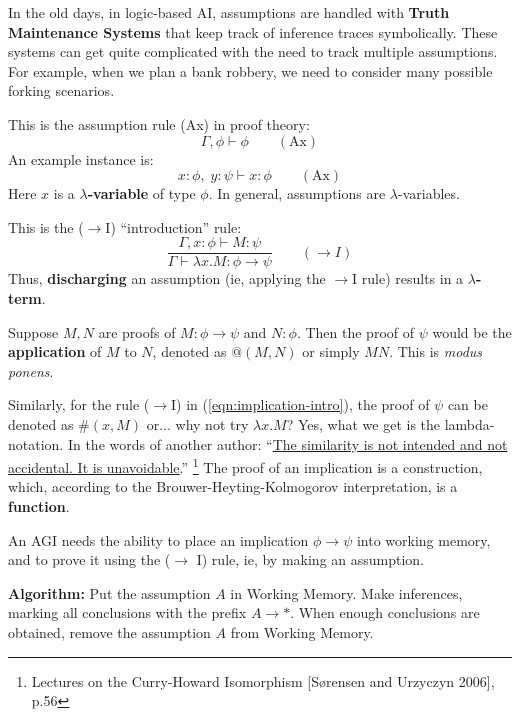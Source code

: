 In the old days, in logic-based AI, assumptions are handled with \textbf{Truth Maintenance Systems} that keep track of inference traces symbolically.  These systems can get quite complicated with the need to track multiple assumptions.  For example, when we plan a bank robbery, we need to consider many possible forking scenarios.  

\begin{tcolorbox}[breakable, parbox=false, fonttitle=\bfseries, title=Curry-Howard Correspondence]

	This is the assumption rule (Ax) in proof theory:
	\begin{equation}
	\Gamma, \phi \vdash \phi \qquad (\mbox{Ax})
	\end{equation}
	An example instance is:
	\begin{equation}
	x : \phi, \; y : \psi \vdash x : \phi \qquad (\mbox{Ax})
	\end{equation}
	Here $x$ is a \textbf{$\lambda$-variable} of type $\phi$.  In general, assumptions are $\lambda$-variables.
	
	This is the ($\rightarrow$I) ``introduction'' rule:
	\begin{equation}
	\frac{ \Gamma, x:\phi \vdash M:\psi }
	{ \Gamma \vdash \lambda x. M : \phi \rightarrow \psi }
	\qquad (\rightarrow I)
	\label{eqn:implication-intro}
	\end{equation}
	Thus, \textbf{discharging} an assumption (ie, applying the $\rightarrow$I rule) results in a \textbf{$\lambda$-term}.
	
	Suppose $M, N$ are proofs of $M: \phi \rightarrow \psi$ and $N: \phi$.  Then the proof of $\psi$ would be the \textbf{application} of $M$ to $N$, denoted as $@(M, N)$ or simply $M N$.  This is \textit{modus ponens}.
	
	Similarly, for the rule ($\rightarrow$I) in (\ref{eqn:implication-intro}), the proof of $\psi$ can be denoted as $\#(x, M)$ or... why not try $\lambda x. M$?  Yes, what we get is the lambda-notation.  In the words of another author:  ``\uline{The similarity is not intended and not accidental.  It is unavoidable}.''  \footnote{Lectures on the Curry-Howard Isomorphism [S\o{}rensen and Urzyczyn 2006], p.56} The proof of an implication is a construction, which, according to the Brouwer-Heyting-Kolmogorov interpretation, is a \textbf{function}.

\end{tcolorbox}

An AGI needs the ability to place an implication $\phi \rightarrow \psi$ into working memory, and to prove it using the ($\rightarrow$ I) rule, ie, by making an assumption.

\textbf{Algorithm:}  Put the assumption $A$ in Working Memory.  Make inferences, marking all conclusions with the prefix $A \rightarrow *$.  When enough conclusions are obtained, remove the assumption $A$ from Working Memory.


